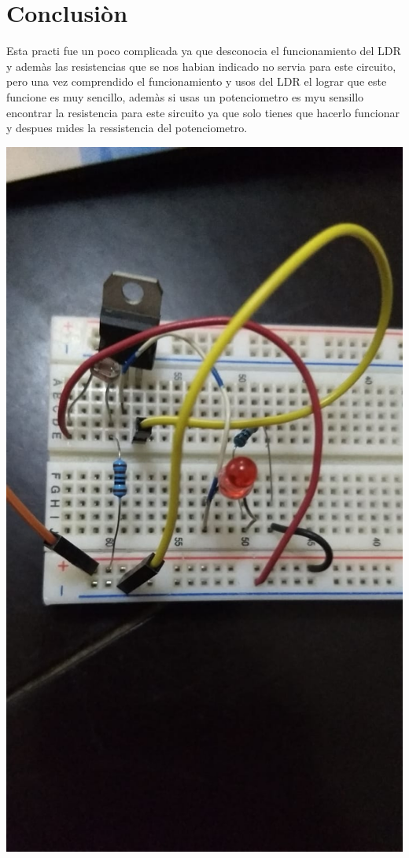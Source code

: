 \documentclass[12pt,a4paper]{report}
\begin{document}
\section{Conclusiòn}
Esta practi fue un poco complicada ya que desconocia el funcionamiento del LDR y ademàs las resistencias que se nos habian indicado no servia para este circuito, pero una vez comprendido el funcionamiento y usos del LDR el lograr que este funcione es muy sencillo, ademàs si usas un potenciometro es myu sensillo encontrar la resistencia para este sircuito ya que solo tienes que hacerlo funcionar y despues mides la ressistencia del potenciometro.\\
\begin{center}
\includegraphics[scale=.4]{LDR.jpeg}
\end{center}
\end{document}
